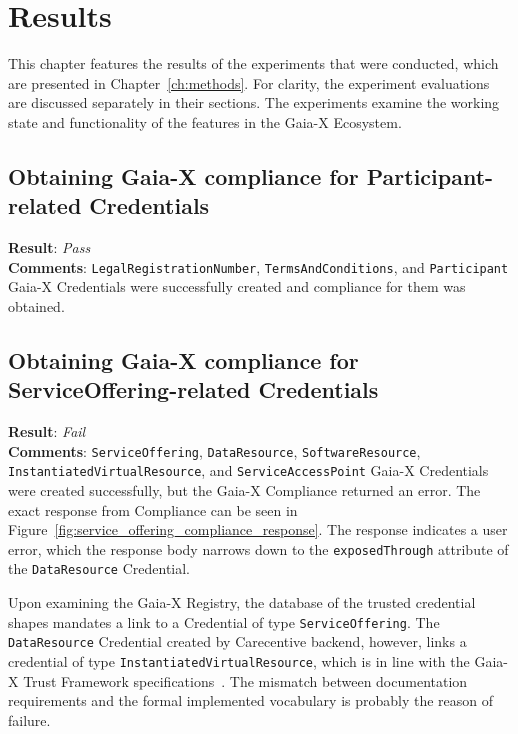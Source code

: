 \chapter{Results}\label{ch:results}

\begin{chapterabstract}
    This chapter features the results of the experiments that were conducted, which are presented in Chapter~\ref{ch:methods}.
    For clarity, the experiment evaluations are discussed separately in their sections.
    The experiments examine the working state and functionality of the features in the Gaia-X Ecosystem.
\end{chapterabstract}

\section{Obtaining Gaia-X compliance for Participant-related Credentials}\label{sec:obtaining-gaia-x-compliance-for-participant-related-credentials}

\textbf{Result}: \textit{Pass}
\\
\textbf{Comments}: \texttt{LegalRegistrationNumber}, \texttt{TermsAndConditions}, and \texttt{Participant} Gaia-X Credentials were successfully created and compliance for them was obtained.

\section{Obtaining Gaia-X compliance for ServiceOffering-related Credentials}\label{sec:obtaining-gaia-x-compliance-for-serviceoffering-related-credentials}

\textbf{Result}: \textit{Fail}
\\
\textbf{Comments}: \texttt{ServiceOffering}, \texttt{DataResource}, \texttt{SoftwareResource}, \texttt{InstantiatedVirtualResource}, and \texttt{ServiceAccessPoint} Gaia-X Credentials were created successfully, but the Gaia-X Compliance returned an error.
The exact response from Compliance can be seen in Figure~\ref{fig:service_offering_compliance_response}.
The response indicates a user error, which the response body narrows down to the \texttt{exposedThrough} attribute of the \texttt{DataResource} Credential.

Upon examining the Gaia-X Registry, the database of the trusted credential shapes mandates a link to a Credential of type \texttt{ServiceOffering}.
The \texttt{DataResource} Credential created by Carecentive backend, however, links a credential of type \texttt{InstantiatedVirtualResource}, which is in line with the Gaia-X Trust Framework specifications~\cite{gaiax_trust_framework}.
The mismatch between documentation requirements and the formal implemented vocabulary is probably the reason of failure.

